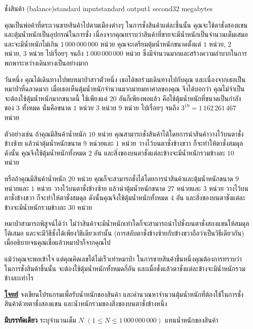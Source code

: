 \documentclass[11pt,a4paper]{article}
\begin{document}
\begin{problem}{ชั่งสินค้า (balance)}{standard input}{standard output}{1 second}{32 megabytes}

คุณเป็นพ่อค้าที่ตระเวนขายสินค้าไปตามเมืองต่างๆ ในการชั่งสินค้าแต่ละชิ้นนั้น คุณจะใช้ตาชั่งสองแขนและตุ้มน้ำหนักเป็นอุปกรณ์ในการชั่ง เนื่องจากคุณทราบว่าสินค้าที่ขายจะมีน้ำหนักเป็นจำนวนเต็มเสมอ และจะมีน้ำหนักไม่เกิน $1\,000\,000\,000$ หน่วย คุณจะเตรียมตุ้มน้ำหนักขนาดตั้งแต่ $1$ หน่วย, $2$ หน่วย, $3$ หน่วย ไปเรื่อยๆ จนถึง $1\,000\,000\,000$ หน่วย ซึ่งมีจำนวนมากและสร้างความลำบากในการพกพาระหว่างเดินทางเป็นอย่างมาก

วันหนึ่ง คุณได้เดินทางไปพบหมาป่าสาวตัวหนึ่ง เธอได้ขอร่วมเดินทางไปกับคุณ และเนื่องจากเธอเป็นหมาป่าที่ฉลาดมาก เมื่อเธอเห็นตุ้มน้ำหนักจำนวนมากมายมหาศาลของคุณ จึงได้บอกว่า คุณไม่จำเป็นจะต้องใช้ตุ้มน้ำหนักมากขนาดนี้ ใช้เพียงแค่ $20$ อันก็เพียงพอแล้ว คือใช้ตุ้มน้ำหนักที่ขนาดเป็นกำลังของ $3$ ทั้งหมด นั่นคือขนาด $1$ หน่วย $3$ หน่วย $9$ หน่วย ไปเรื่อยๆ จนถึง $3^{19} = 1\,162\,261\,467$ หน่วย

ตัวอย่างเช่น ถ้าคุณมีสินค้าน้ำหนัก $10$ หน่วย คุณสามารถชั่งสินค้าได้โดยการนำสินค้าวางไว้บนตาชั่งข้างซ้าย แล้วนำตุ้มน้ำหนักขนาด $9$ หน่วยและ $1$ หน่วย วางไว้บนตาชั่งข้างขวา ก็จะทำให้ตาชั่งสมดุล ดังนั้น คุณจึงใช้ตุ้มน้ำหนักทั้งหมด $2$ อัน และสิ่งของบนตาชั่งแต่ละข้างจะมีน้ำหนักรวมข้างละ $10$ หน่วย

หรือถ้าคุณมีสินค้าน้ำหนัก $20$ หน่วย คุณก็จะสามารถชั่งได้โดยการนำสินค้าและตุ้มน้ำหนักขนาด $9$ หน่วยและ $1$ หน่วย วางไว้บนตาชั่งข้างซ้าย แล้วนำตุ้มน้ำหนักขนาด $27$ หน่วยและ $3$ หน่วย วางไว้บนตาชั่งข้างขวา ก็จะทำให้ตาชั่งสมดุล ดังนั้นคุณจึงใช้ตุ้มน้ำหนักทั้งหมด $4$ อัน และสิ่งของบนตาชั่งแต่ละข้างจะมีน้ำหนักรวมข้างละ $30$ หน่วย

หมาป่าสามารถพิสูจน์ได้ว่า ไม่ว่าสินค้าจะมีน้ำหนักเท่าใดก็จะสามารถนำไปชั่งบนตาชั่งสองแขนให้สมดุลได้เสมอ และจะมีวิธีชั่งได้เพียงวิธีเดียวเท่านั้น (การสลับตาชั่งข้างซ้ายกับข้างขวาถือว่าเป็นวิธีเดียวกัน) เมื่ออธิบายจนคุณเชื่อแล้วหมาป่าก็จากคุณไป

แม้ว่าคุณจะพอเข้าใจ แต่คุณคิดเลขได้ไม่เร็วเท่าหมาป่า ในการขายสินค้าชิ้นหนึ่งคุณต้องการทราบว่า ในการชั่งสินค้าชิ้นนั้น จะต้องใช้ตุ้มน้ำหนักทั้งหมดกี่อัน และเมื่อชั่งแล้วตาชั่งแต่ละข้างจะมีน้ำหนักรวมข้างละเท่าไร

\bigskip
\underline{\textbf{โจทย์}}  จงเขียนโปรแกรมเพื่อรับน้ำหนักของสินค้า และคำนวณหาจำนวนตุ้มน้ำหนักที่ต้องใช้ในการชั่งสินค้าด้วยตาชั่งสองแขน และน้ำหนักรวมของสิ่งของบนตาชั่งข้างหนึ่ง


\InputFile

\textbf{มีบรรทัดเดียว} ระบุจำนวนเต็ม $N$ $(1 \leq N \leq 1\,000\,000\,000)$ แทนน้ำหนักของสินค้า


\end{problem}
\end{document}
